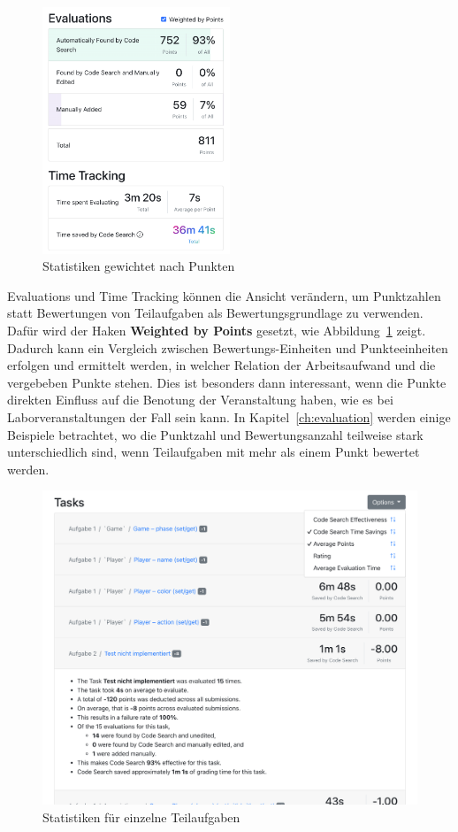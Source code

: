 \begin{figure}
    \centering
    \includegraphics[width=0.5\textwidth]{images/assignment-statistics-by-points}
    \caption{Statistiken gewichtet nach Punkten}
    \label{fig:assignment-statistics-by-points}
\end{figure}

Evaluations und Time Tracking können die Ansicht verändern, um Punktzahlen statt Bewertungen von Teilaufgaben als Bewertungsgrundlage zu verwenden.
Dafür wird der Haken \textbf{Weighted by Points} gesetzt, wie Abbildung~\ref{fig:assignment-statistics-by-points} zeigt.
Dadurch kann ein Vergleich zwischen Bewertungs-Einheiten und Punkteeinheiten erfolgen und ermittelt werden, in welcher Relation der Arbeitsaufwand und die vergebeben Punkte stehen.
Dies ist besonders dann interessant, wenn die Punkte direkten Einfluss auf die Benotung der Veranstaltung haben, wie es bei Laborveranstaltungen der Fall sein kann.
In Kapitel~\ref{ch:evaluation} werden einige Beispiele betrachtet, wo die Punktzahl und Bewertungsanzahl teilweise stark unterschiedlich sind, wenn Teilaufgaben mit mehr als einem Punkt bewertet werden.

\begin{figure}
    \centering
    \includegraphics[width=\textwidth]{images/assignment-statistics-tasks.png}
    \caption{Statistiken für einzelne Teilaufgaben}
    \label{fig:assignment-statistics-tasks}
\end{figure}

